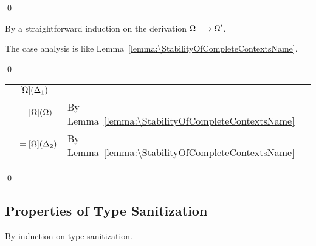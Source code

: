 \qed

\begin{lemma}[\FinishingCompletionsName]
  \label{lemma:\FinishingCompletionsName}
  \FinishingCompletionsBody
\end{lemma}

\proof

By a straightforward induction on the derivation $\Omega \longrightarrow \Omega'$.

The case analysis is like
Lemma~\ref{lemma:\StabilityOfCompleteContextsName}.

\qed

\begin{lemma}[\ConfluenceOfCompletenessName]
  \label{lemma:\ConfluenceOfCompletenessName}
  \ConfluenceOfCompletenessBody
\end{lemma}

\proof

\mbox{} %

\begin{longtable}[l]{lll}
  & $[\Omega](\Delta_1) $
  & \\
  & $= [\Omega](\Omega) $
  & By Lemma~\ref{lemma:\StabilityOfCompleteContextsName} \\
  & $= [\Omega](\Delta_2) $
  & By Lemma~\ref{lemma:\StabilityOfCompleteContextsName} \\
\end{longtable}

\qed

\subsection{Properties of Type Sanitization}

\begin{lemma}[\TypeSanitizationExtensionName]
  \label{lemma:\TypeSanitizationExtensionName}
  \TypeSanitizationExtensionBody
\end{lemma}

\proof

By induction on type sanitization.

